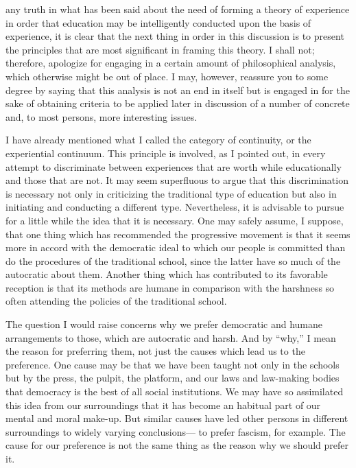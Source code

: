 
 any truth in what has been said about the need of forming a theory of 
experience in order that education may be intelligently conducted upon the basis of 
experience, it is clear that the next thing in order in this discussion is to present the 
principles that are most significant in framing this theory. I shall not; therefore, apologize 
for engaging in a certain amount of philosophical analysis, which otherwise might be out 
of place. I may, however, reassure you to some degree by saying that this analysis is not 
an end in itself but is engaged in for the sake of obtaining criteria to be applied later in 
discussion of a number of concrete and, to most persons, more interesting issues. 


I have already mentioned what I called the category of continuity, or the experiential 
continuum. This principle is involved, as I pointed out, in every attempt to discriminate 
between experiences that are worth while educationally and those that are not. It may 
seem superfluous to argue that this discrimination is necessary not only in criticizing the 
traditional type of education but also in initiating and conducting a different type. 
Nevertheless, it is advisable to pursue for a little while the idea that it is necessary. One 
may safely assume, I suppose, that one thing which has recommended the progressive 
movement is that it seems more in accord with the democratic ideal to which our people 
is committed than do the procedures of the traditional school, since the latter have so 
much of the autocratic about them. Another thing which has contributed to its favorable 
reception is that its methods are humane in comparison with the harshness so often 
attending the policies of the traditional school. 

The question I would raise concerns why we prefer democratic and humane 
arrangements to those, which are autocratic and harsh. And by \enquote{why,} I mean the reason 
for preferring them, not just the causes which lead us to the preference. One cause may be 
that we have been taught not only in the schools but by the press, the pulpit, the platform, 
and our laws and law-making bodies that democracy is the best of all social institutions. 
We may have so assimilated this idea from our surroundings that it has become an 
habitual part of our mental and moral make-up. But similar causes have led other persons 
in different surroundings to widely varying conclusions— to prefer fascism, for example. 
The cause for our preference is not the same thing as the reason why we should prefer it. 

